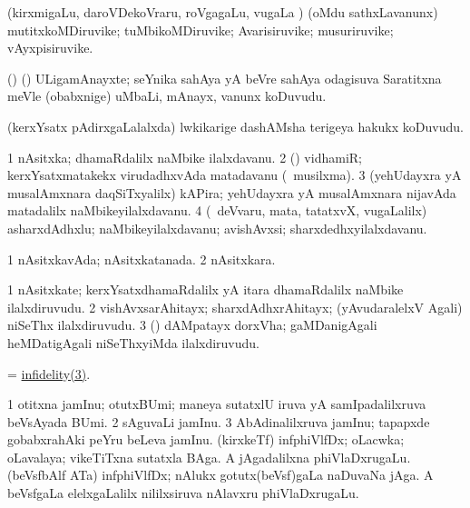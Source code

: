 \bentry
{}
\gl{\nA}
\bmng
(kirxmigaLu, daroVDekoVraru, roVgagaLu, \mo vugaLa \vi) (oMdu sathxLavanunx) mutitxkoMDiruvike; tuMbikoMDiruvike; Avarisiruvike; musuriruvike; vAyxpisiruvike. 
\emng
\eentry

\bentry
{}
\gl{\nA}
\bmng
(\birx) (\ca) ULigamAnayxte; seYnika sahAya yA beVre sahAya odagisuva Saratitxna meVle (obabxnige) uMbaLi, mAnayx, \mo vanunx koDuvudu. 
\emng

\noindent
\gl{\pagu}
\bmng
{} (kerxYsatx pAdirxgaLalalxda) lwkikarige dashAMsha terigeya hakukx koDuvudu. 
\emng
\eentry

\bentry
{}
\gl{\nA}
\bmng
\bnum
\num{1} nAsitxka; dhamaRdalilx naMbike ilalxdavanu. 
\num{2} (\ca) vidhamiR; kerxYsatxmatakekx virudadhxvAda matadavanu (\kanmu\ musilxma). 
\num{3} (yehUdayxra yA musalAmxnara daqSiTxyalilx) kAPira; yehUdayxra yA musalAmxnara nijavAda matadalilx naMbikeyilalxdavanu. 
\num{4} (\sA\ deVvaru, mata, tatatxvX, \mo vugaLalilx) asharxdAdhxlu; naMbikeyilalxdavanu; avishAvxsi; sharxdedhxyilalxdavanu. 
\enum
\emng
\eentry

\bentry
{}
\gl{\gu}
\bmng
\bnum
\num{1} nAsitxkavAda; nAsitxkatanada. 
\num{2} nAsitxkara. 
\enum
\emng
\eentry

\bentry
{}
\gl{\nA}
\bmng
\bnum
\num{1} nAsitxkate; kerxYsatxdhamaRdalilx yA itara dhamaRdalilx naMbike ilalxdiruvudu. 
\num{2} vishAvxsarAhitayx; sharxdAdhxrAhitayx; (yAvudaralelxV Agali) niSeThx ilalxdiruvudu. 
\hypertarget{infidelity(3)}{} 
\num{3} (\kanmu) dAMpatayx dorxVha; gaMDanigAgali heMDatigAgali niSeThxyiMda ilalxdiruvudu. 
\enum
\emng

\noindent
\gl{\pagu}
\expl{}
\bmng
{} = \hyperlink{infidelity(3)}{infidelity(3)}. 
\emng
\eentry

\bentry
{}
\gl{\nA}
\bmng
\bnum
\num{1} otitxna jamInu; otutxBUmi; maneya sutatxlU iruva yA samIpadalilxruva beVsAyada BUmi. 
\num{2} sAguvaLi jamInu. 
\num{3} AbAdinalilxruva jamInu; tapapxde gobabxrahAki peYru beLeva jamInu. 
 (kirxkeTf) 
\banum
{} infphiVlfDx; oLacwka; oLavalaya; vikeTiTxna sutatxla BAga. 
 A jAgadalilxna phiVlaDxrugaLu. 
\eanum
\numie
{} (beVsfbAlf ATa) 
\banum
{} infphiVlfDx; nAlukx gotutx(beVsf)gaLa naDuvaNa jAga. 
 A beVsfgaLa elelxgaLalilx nililxsiruva nAlavxru phiVlaDxrugaLu. 
\eanum
\numie
\enum
\emng
\eentry

